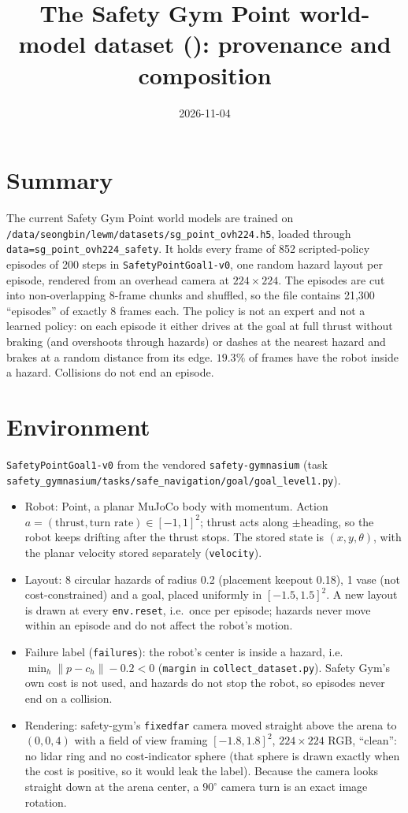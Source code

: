 \documentclass[11pt]{article}
\title{The Safety Gym Point world-model dataset (\file{sg_point_ovh224.h5}): provenance and composition}
\author{}
\date{2026-11-04}
\newcommand{\file}[1]{\nolinkurl{#1}}
\begin{document}
\maketitle

\section{Summary}

The current Safety Gym Point world models are trained on \file{/data/seongbin/lewm/datasets/sg_point_ovh224.h5}, loaded through \file{data=sg_point_ovh224_safety}. It holds every frame of 852 scripted-policy episodes of 200 steps in \file{SafetyPointGoal1-v0}, one random hazard layout per episode, rendered from an overhead camera at $224 \times 224$. The episodes are cut into non-overlapping 8-frame chunks and shuffled, so the file contains 21{,}300 ``episodes'' of exactly 8 frames each. The policy is not an expert and not a learned policy: on each episode it either drives at the goal at full thrust without braking (and overshoots through hazards) or dashes at the nearest hazard and brakes at a random distance from its edge. $19.3\%$ of frames have the robot inside a hazard. Collisions do not end an episode.

\section{Environment}

\file{SafetyPointGoal1-v0} from the vendored \file{safety-gymnasium} (task \file{safety_gymnasium/tasks/safe_navigation/goal/goal_level1.py}).

\begin{itemize}
\item Robot: Point, a planar MuJoCo body with momentum. Action $a = (\text{thrust}, \text{turn rate}) \in [-1, 1]^2$; thrust acts along $\pm$heading, so the robot keeps drifting after the thrust stops. The stored state is $(x, y, \theta)$, with the planar velocity stored separately (\file{velocity}).
\item Layout: 8 circular hazards of radius 0.2 (placement keepout 0.18), 1 vase (not cost-constrained) and a goal, placed uniformly in $[-1.5, 1.5]^2$. A new layout is drawn at every \file{env.reset}, i.e.\ once per episode; hazards never move within an episode and do not affect the robot's motion.
\item Failure label (\file{failures}): the robot's center is inside a hazard, i.e.\ $\min_h \lVert p - c_h \rVert - 0.2 < 0$ (\file{margin} in \file{collect_dataset.py}). Safety Gym's own cost is not used, and hazards do not stop the robot, so episodes never end on a collision.
\item Rendering: safety-gym's \file{fixedfar} camera moved straight above the arena to $(0, 0, 4)$ with a field of view framing $[-1.8, 1.8]^2$, $224 \times 224$ RGB, ``clean'': no lidar ring and no cost-indicator sphere (that sphere is drawn exactly when the cost is positive, so it would leak the label). Because the camera looks straight down at the arena center, a $90^\circ$ camera turn is an exact image rotation.
\end{itemize}
\end{document}
